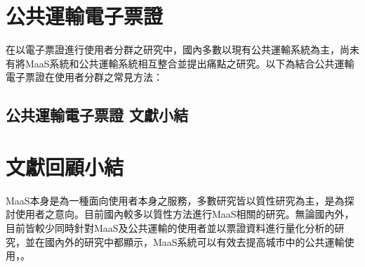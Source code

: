 \section{公共運輸電子票證}\label{ux516cux5171ux904bux8f38ux96fbux5b50ux7968ux8b49}

在以電子票證進行使用者分群之研究中，國內多數以現有公共運輸系統為主，尚未有將MaaS系統和公共運輸系統相互整合並提出痛點之研究。以下為結合公共運輸電子票證在使用者分群之常見方法：

\subsection{公共運輸電子票證
文獻小結}\label{ux516cux5171ux904bux8f38ux96fbux5b50ux7968ux8b49-ux6587ux737bux5c0fux7d50}

\section{文獻回顧小結}\label{ux6587ux737bux56deux9867ux5c0fux7d50}

MaaS本身是為一種面向使用者本身之服務，多數研究皆以質性研究為主，是為探討使用者之意向。目前國內較多以質性方法進行MaaS相關的研究。無論國內外，目前皆較少同時針對MaaS及公共運輸的使用者並以票證資料進行量化分析的研究，並在國內外的研究中都顯示，MaaS系統可以有效去提高城市中的公共運輸使用，。